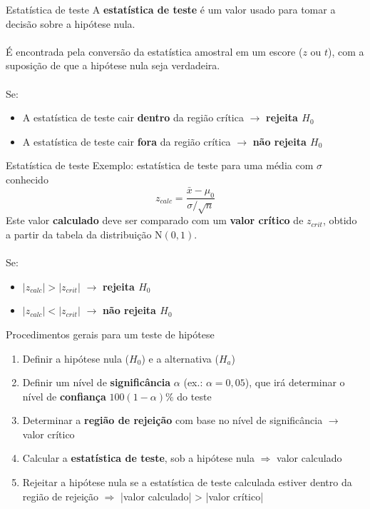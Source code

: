 \documentclass[10pt]{beamer}\usepackage[]{graphicx}\usepackage[]{color}
\theoremstyle{definition}
\begin{document}
\begin{frame}{Estatística de teste}
  A \textbf{estatística de teste} é um valor usado para tomar a decisão
  sobre a hipótese nula.\\~\\
  É encontrada pela conversão da estatística amostral em um escore ($z$
  ou $t$), com a suposição de que a hipótese nula seja verdadeira.\\~\\
  Se:
  \begin{itemize}
  \item A estatística de teste cair \textbf{dentro} da região crítica
    $\rightarrow$ \textbf{rejeita $H_0$}
  \item A estatística de teste cair \textbf{fora} da região crítica
    $\rightarrow$ \textbf{não rejeita $H_0$}
  \end{itemize}
\end{frame}

\begin{frame}{Estatística de teste}
  Exemplo: estatística de teste para uma média com $\sigma$ conhecido
  \begin{equation*}
    z_{calc} = \frac{\bar{x} - \mu_0}{\sigma/\sqrt{n}}
  \end{equation*}
  Este valor \textbf{calculado} deve ser comparado com um \textbf{valor
    crítico} de $z_{crit}$, obtido a partir da tabela da distribuição
  $\text{N}(0,1)$.\\~\\
  Se:
  \begin{itemize}
  \item $|z_{calc}| > |z_{crit}|$ $\rightarrow$ \textbf{rejeita $H_0$}
  \item $|z_{calc}| < |z_{crit}|$ $\rightarrow$ \textbf{não rejeita $H_0$}
  \end{itemize}
\end{frame}

\begin{frame}{Procedimentos gerais para um teste de hipótese}
\begin{enumerate}
\item Definir a hipótese nula ($H_0$) e a alternativa ($H_a$)
\item Definir um nível de \textbf{significância} $\alpha$ (ex.: $\alpha
  = 0,05$), que irá determinar o nível de \textbf{confiança}
  $100(1-\alpha)\%$ do teste
\item Determinar a \textbf{região de rejeição} com base no nível de
  significância $\rightarrow$ valor crítico
\item Calcular a \textbf{estatística de teste}, sob a hipótese nula
  $\Rightarrow$ valor calculado
\item Rejeitar a hipótese nula se a estatística de teste calculada
  estiver dentro da região de rejeição $\Rightarrow$ |valor calculado| >
  |valor crítico|
\end{enumerate}
\end{frame}
\end{document}
